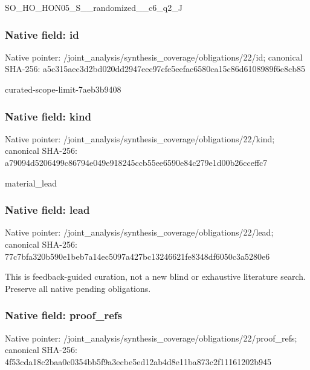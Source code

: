 \documentclass[10pt,a4paper]{article}
\begin{document}
\begingroup\raggedright\sloppy SO\_\allowbreak{}HO\_\allowbreak{}HON05\_\allowbreak{}S\_\allowbreak{}\_\allowbreak{}randomized\_\allowbreak{}\_\allowbreak{}c6\_\allowbreak{}q2\_\allowbreak{}J\par\endgroup

\subsubsection{Native field: id}
Native pointer: /joint\_\allowbreak{}analysis/synthesis\_\allowbreak{}coverage/obligations/22/id; canonical SHA-256: a5c315aec3d2bd020dd2947eec97cfe5eefac6580ca15c86d6108989f6e8cb85

\begingroup\raggedright\sloppy curated-scope-limit-7aeb3b9408\par\endgroup

\subsubsection{Native field: kind}
Native pointer: /joint\_\allowbreak{}analysis/synthesis\_\allowbreak{}coverage/obligations/22/kind; canonical SHA-256: a79094d5206499c86794e049e918245ccb55ee6590e84c279e1d00b26cceffc7

\begingroup\raggedright\sloppy material\_\allowbreak{}lead\par\endgroup

\subsubsection{Native field: lead}
Native pointer: /joint\_\allowbreak{}analysis/synthesis\_\allowbreak{}coverage/obligations/22/lead; canonical SHA-256: 77c7bfa320b590e1beb7a14ec5097a427bc13246621fe8348df6050c3a5280e6

\begingroup\raggedright\sloppy This is feedback-guided curation,\allowbreak{} not a new blind or exhaustive literature search. Preserve all native pending obligations.\par\endgroup

\subsubsection{Native field: proof\_\allowbreak{}refs}
Native pointer: /joint\_\allowbreak{}analysis/synthesis\_\allowbreak{}coverage/obligations/22/proof\_\allowbreak{}refs; canonical SHA-256: 4f53cda18c2baa0c0354bb5f9a3ecbe5ed12ab4d8e11ba873c2f11161202b945
\end{document}
